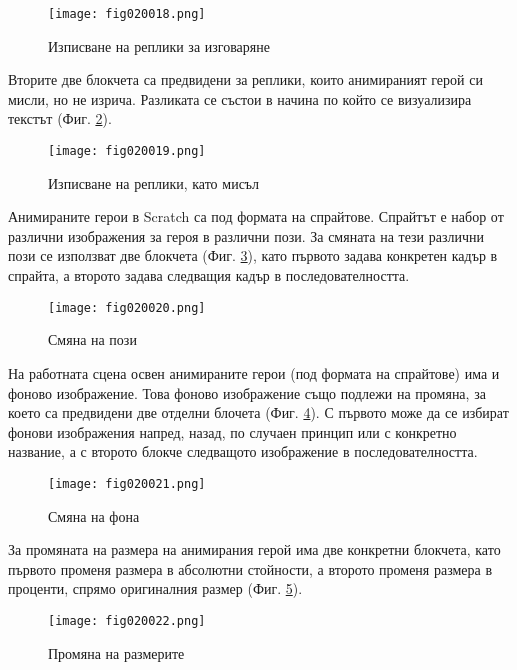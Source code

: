 \begin{figure}[H]
  \centering
  \texttt{[image: fig020018.png]}
  \caption{Изписване на реплики за изговаряне}
\label{fig020018}
\end{figure}

Вторите две блокчета са предвидени за реплики, които анимираният герой си мисли, но не изрича. Разликата се състои в начина по който се визуализира текстът (Фиг. \ref{fig020019}).

\begin{figure}[H]
  \centering
  \texttt{[image: fig020019.png]}
  \caption{Изписване на реплики, като мисъл}
\label{fig020019}
\end{figure}

Анимираните герои в Scratch са под формата на спрайтове. Спрайтът е набор от различни изображения за героя в различни пози. За смяната на тези различни пози се използват две блокчета (Фиг. \ref{fig020020}), като първото задава конкретен кадър в спрайта, а второто задава следващия кадър в последователността.

\begin{figure}[H]
  \centering
  \texttt{[image: fig020020.png]}
  \caption{Смяна на пози}
\label{fig020020}
\end{figure}

На работната сцена освен анимираните герои (под формата на спрайтове) има и фоново изображение. Това фоново изображение също подлежи на промяна, за което са предвидени две отделни блочета (Фиг. \ref{fig020021}). С първото може да се избират фонови изображения напред, назад, по случаен принцип или с конкретно название, а с второто блокче следващото изображение в последователността. 

\begin{figure}[H]
  \centering
  \texttt{[image: fig020021.png]}
  \caption{Смяна на фона}
\label{fig020021}
\end{figure}

За промяната на размера на анимирания герой има две конкретни блокчета, като първото променя размера в абсолютни стойности, а второто променя размера в проценти, спрямо оригиналния размер (Фиг. \ref{fig020022}).

\begin{figure}[H]
  \centering
  \texttt{[image: fig020022.png]}
  \caption{Промяна на размерите}
\label{fig020022}
\end{figure}

